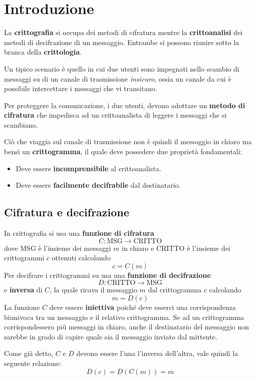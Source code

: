 \chapter{Introduzione}\label{intro}
La \textbf{crittografia} si occupa dei metodi di cifratura mentre la \textbf{crittoanalisi} dei metodi di decifrazione
di un messaggio. Entrambe si possono riunire sotto la branca della \textbf{crittologia}.

Un tipico scenario \`e quello in cui due utenti sono impegnati nello scambio di messaggi su di un canale di trasmissione
\emph{insicuro}, ossia un canale da cui \`e possibile intercettare i messaggi che vi transitano.

Per proteggere la comunicazione, i due utenti, devono adottare un \textbf{metodo di cifratura} che impedisca ad un
crittoanalista di leggere i messaggi che si scambiano.

Ci\`o che viaggia sul canale di trasmissione non \`e quindi il messaggio in chiaro ma bens\`i un \textbf{crittogramma},
il quale deve possedere due propriet\`a fondamentali:
\begin{itemize}
	\item Deve essere \textbf{incomprensibile} al crittoanalista.
	\item Deve essere \textbf{facilmente decifrabile} dal destinatario.
\end{itemize}

\section{Cifratura e decifrazione}\label{cifratura}
In crittografia si usa una \textbf{funzione di cifratura}
\[ C : \text{MSG} \rightarrow \text{CRITTO} \]
dove MSG \`e l'insieme dei messaggi $m$ in chiaro e CRITTO \`e l'insieme dei crittogrammi $c$ ottenuti calcolando
\[ c = C(m) \]
Per decifrare i crittogrammi su usa una \textbf{funzione di decifrazione}
\[ D : \text{CRITTO} \rightarrow \text{MSG} \]
e \textbf{inversa} di $C$, la quale ricava il messaggio $m$ dal crittogramma $c$ calcolando
\[ m = D(c) \]
La funzione $C$ deve essere \textbf{iniettiva} poich\'e deve esserci una corrispondenza biunivoca tra un messaggio e
il relativo crittogramma. Se ad un crittogramma corrispondessero pi\`u messaggi in chiaro, anche il destinatario del
messaggio non sarebbe in grado di capire quale sia il messaggio inviato dal mittente.

Come gi\`a detto, $C$ e $D$ devono essere l'una l'inversa dell'altra, vale quindi la seguente relazione:
\[ D(c) = D(C(m)) = m \]

